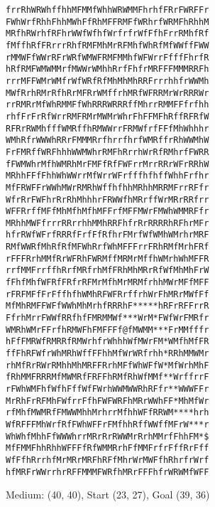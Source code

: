 \documentclass[12pt, article]{scrartcl}
\begin{document}
\begin{figure}[p]
\caption{Medium: (40, 40), Start (23, 27), Goal (39, 36)}
\begin{verbatim}
frrRhWRWhffhhMFMMfWhhWRWMMFhrhfFRrFWRFFr
FWhWrfRhhFhhMWhFfRhMFFRMFfWRhrfWRMFhRhhM
MRfhRWrhfRFhrWWfWfhfWrfrfrWfFfhFrrRMhfRf
fMffhRfFRrrrRhfRMFMhMrRFMhfWhRfMfWWffFWW
rMMWFfWWrRFrWRfWMWFRMFMMhfWFWrrFfffFhrfR
hRfRMFWMWMMrfMWWrWMhhRrfFhfrMRFFFMMMRRFh
rrrMFFWMrWMfrWfWRfRfMhMhMhRRFrrrhhfrWWMh
MWfRrhRMrRfhRrMFRrWMffrhMRfWFRRMrWrRRRWr
rrRMRrMfWhRMMFfWhRRRWRRRffMhrrRMMFFfrfhh
rhfFrFrRfWrrRMFRMrMWMrWhrFhFFMFhRffRFRfW
RFRrRWMhfffWMRffhRMWWrrFRMWfrfFFfMhWhhhr
WMhRfrWWWhRRrFMMMRrfhrrfhrfWMRffrRhWWMhW
FrFMRffWRFhhhWWMWhrRMFhRrrhWrRfRMhrfFWRR
fFWMWhrMfhWMRhMrFMFfRfFWFrrMrrRRrWFrRRhW
MRhhFFfFhhWhWWrrMfWrrWFrfffhfhffWhhFrfhr
MfFRWFFrWWhMWrRMRhWffhfhhMRhhMRRMFrrRFfr
WfrRrFWFhrRrRhMhhhrFRWWfhMRrffWrMRrRRfrr
WFFRrffMFfMhMfhMfhMFFrfMFFMWrFMWhWMMRFfr
MRhhMWFfrrrRRrrhhMMhRRFhfrRrRRRRhRFhrMFr
hfrRWfWFrfRRRfFrfFfRfhrFMrfWfWMhWMrhrMRF
RMfWWRfMhRfRfMFWhRrfWhMFFFrrFRhRMfMrhFRf
rFFFRrhMMfRrWFRhFWRMffMRMrMffhWMrhWhMFFR
rrfMMFrrffhRrfMRfrhMfFRhMhMRrRfWfMhMhFrW
fFhfMhfWFRfFRfrRFMrMfhMrMRMfrhhMWrMFfMFF
rFRFMFfFrFffhfhWMhRFWFRrffrhWrFhMRrMWfFf
MfMhRMFFWFfWWhMhMrhfRRRhF*****hRFrRFFrrR
FfrhMrrFWWfRRfhfFMRMMWf***WrM*FWfWrFMRfr
WMRhWMrFFrfhRMWFhFMFFFf@fMWMM***FrMMfffr
hFfFMRWfRMRRfRMWrhfrWhhhWfMWrFM*WMfhMfFR
ffFhRFWfrWhMRhWffFFhhMfWrWRfrhh*RRhMMWMr
rhMfRrRWrRMhhMhMRFFRrhMFfWhWFfW*MfWrhMhF
fRhMMFRRRMfMWMRfFRFFhRMfRhWfMMf**WrffrrF
rFWhWMFhfWfhFffWfFWrhWWMWWRhRFfr**WWWFFr
MrRhFrRFMhFWfrrFfhFWFWRFhMRrWWhFF*MhMfWr
rfMhfMWMRfFMWWMhhMrhrrMfhhWFfRRWM****hrh
WfRFFFMhWrfRfFWhWFFrFMfhhRffWWffMFrW***r
WhWhfMhhFfWWWhrrMRrRrRWWMrRrhMMrfFhhFM*$
MfFMMFhhRhhWFFFfRfWMMRrhFfMMFrfrFffRrFff
WfFfhRrrhfMrMRrMRFhRFfMhrWrMWFfhRhrfrWrf
hfMRFrWWrrhrRFFMMMFWRfhMRrFFFhfrWRWMfWFF
\end{verbatim}
\end{figure}
\end{document}
